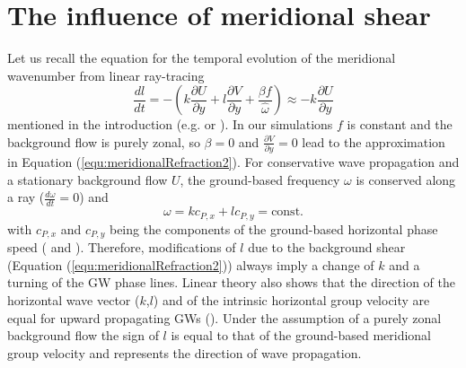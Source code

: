 

\section{The influence of meridional shear}
\label{sec:3D_shear}
Let us recall the equation for the temporal evolution of the meridional wavenumber from linear ray-tracing
\begin{equation}
    \frac{dl}{dt} = -(k \frac{\partial U}{\partial y} + l \frac{\partial V}{\partial y} + \frac{\beta f}{\hat{\omega}})
    \approx -k \frac{\partial U}{\partial y}
    \label{equ:meridionalRefraction2}
\end{equation}
mentioned in the introduction (e.g. \cite[]{dunkerton_inertiagravity_1984} or \cite[]{eckermann_ray-tracing_1992}). In our simulations $f$ is constant and the background flow is purely zonal, so $\beta=0$ and $\frac{\partial V}{\partial y}=0$ lead to the approximation in Equation (\ref{equ:meridionalRefraction2}). For conservative wave propagation and a stationary background flow $U$, the ground-based frequency $\omega$ is conserved along a ray ($\frac{d \omega}{d t} = 0$) and 
\begin{equation}
    \omega = k c_{P,x} + l c_{P,y} = \textrm{const.}
    \label{equ:const_omega}
\end{equation}
with $c_{P,x}$ and $c_{P,y}$ being the components of the ground-based horizontal phase speed (\cite[]{lighthill_waves_1978} and \cite[]{eckermann_ray-tracing_1992}). Therefore, modifications of $l$ due to the background shear (Equation (\ref{equ:meridionalRefraction2})) always imply a change of $k$ and a turning of the GW phase lines. Linear theory also shows that the direction of the horizontal wave vector ($k$,$l$) and of the intrinsic horizontal group velocity are equal for upward propagating GWs (\cite[]{sato_origins_2009}). Under the assumption of a purely zonal background flow the sign of $l$ is equal to that of the ground-based meridional group velocity and represents the direction of wave propagation.\\

